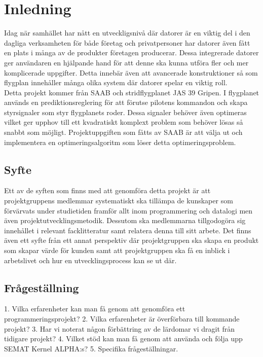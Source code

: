 \section{Inledning}
Idag när samhället har nått en utveckligsnivå där datorer är en viktig del i den dagliga verksamheten för både företag och privatpersoner har datorer även fått en plats i många av de produkter företagen producerar. Dessa integrerade datorer ger användaren en hjälpande hand för att denne ska kunna utföra fler och mer komplicerade uppgifter. Detta innebär även att avancerade konstruktioner så som flygplan innehåller många olika system där datorer spelar en viktig roll.
\\
Detta projekt kommer från SAAB och stridflygplanet JAS 39 Gripen. I flygplanet används en prediktionsreglering för att förutse pilotens kommandon och skapa styrsignaler som styr flygplanets roder. Dessa signaler behöver även optimeras vilket ger upphov till ett kvadratiskt komplext problem som behöver lösas så snabbt som möjligt. Projektuppgiften som fåtts av SAAB är att välja ut och implementera en optimeringsalgoritm som löser detta optimeringsproblem.

\subsection{Syfte}
Ett av de syften som finns med att genomföra detta projekt är att projektgruppens medlemmar systematiskt ska tillämpa de kunskaper som förvärvats under studietiden framför allt inom programmering och datalogi men även projektutvecklingsmetodik. Dessutom ska medlemmarna tillgodogöra sig innehållet i relevant facklitteratur samt relatera denna till sitt arbete. 
Det finns även ett syfte från ett annat perspektiv där projektgruppen ska skapa en produkt som skapar värde för kunden samt att projektgruppen ska få en inblick i arbetslivet och hur en utvecklingsprocess kan se ut där.

\subsection{Frågeställning}
1. Vilka erfarenheter kan man få genom att genomföra ett programmeringsprojekt?
2. Vilka erfarenheter är överförbara till kommande projekt?
3. Har vi noterat någon förbättring av de lärdomar vi dragit från tidigare projekt?
4. Vilket stöd kan man få genom att använda och följa upp SEMAT Kernel ALPHA:s?
5. Specifika frågeställningar.



